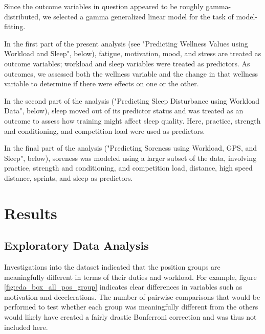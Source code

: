 \documentclass{article}
\begin{document}

			Since the outcome variables in question appeared to be roughly
			gamma-distributed, we selected a gamma generalized linear model
			for the task of model-fitting.

			In the first part of the present analysis (see
			"Predicting Wellness Values using Workload and Sleep", below),
			fatigue, motivation, mood, and stress are treated as outcome
			variables; workload and sleep variables
			were treated as predictors. As outcomes, we
			assessed both the wellness variable and the change in that wellness
			variable to determine if there were effects on one or the other.

			In the second part of the analysis ("Predicting Sleep Disturbance using
			Workload Data", below), sleep moved out of its predictor status and
			was treated as an outcome to assess how
			training might affect sleep quality. Here, practice, strength and
			conditioning, and competition load were used as predictors.

			In the final part of the analysis ("Predicting Soreness using Workload,
			GPS, and Sleep", below), soreness was modeled using a larger
			subset of the data, involving practice, strength and conditioning, and
			competition load, distance, high speed distance, sprints, and sleep
			as predictors.

	\section{Results}
		
		\subsection{Exploratory Data Analysis}

			Investigations into the dataset indicated that the position groups
			are meaningfully different in terms of their duties and workload.
			For example, figure \ref{fig:eda_box_all_pos_group} indicates
			clear differences in variables such as motivation and decelerations.
			The number of pairwise comparisons that would be performed
			to test whether each group was meaningfully different from the others
			would likely have created a fairly drastic Bonferroni correction
			and was thus not included here.
\end{document}
